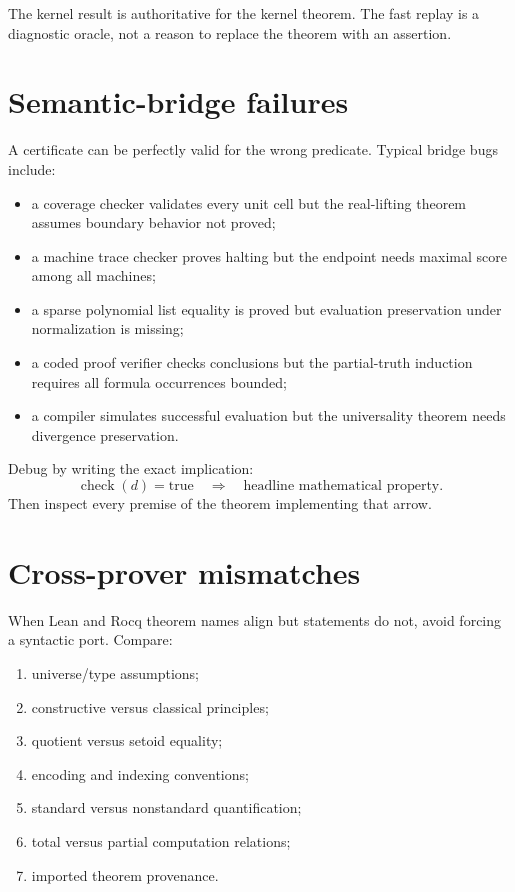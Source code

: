 \documentclass[
  10pt,
  a4paper,
  twoside,
  open=any,
  parskip=half,
  headings=big
]{scrreprt}
\begin{document}
The kernel result is authoritative for the kernel theorem.  The fast replay is
a diagnostic oracle, not a reason to replace the theorem with an assertion.

\section{Semantic-bridge failures}

A certificate can be perfectly valid for the wrong predicate.  Typical bridge
bugs include:

\begin{itemize}
  \item a coverage checker validates every unit cell but the real-lifting
        theorem assumes boundary behavior not proved;
  \item a machine trace checker proves halting but the endpoint needs maximal
        score among all machines;
  \item a sparse polynomial list equality is proved but evaluation preservation
        under normalization is missing;
  \item a coded proof verifier checks conclusions but the partial-truth
        induction requires all formula occurrences bounded;
  \item a compiler simulates successful evaluation but the universality
        theorem needs divergence preservation.
\end{itemize}

Debug by writing the exact implication:
\[
  \operatorname{check}(d)=\mathrm{true}
  \quad\Longrightarrow\quad
  \text{headline mathematical property}.
\]
Then inspect every premise of the theorem implementing that arrow.

\section{Cross-prover mismatches}

When Lean and Rocq theorem names align but statements do not, avoid forcing a
syntactic port.  Compare:

\begin{enumerate}
  \item universe/type assumptions;
  \item constructive versus classical principles;
  \item quotient versus setoid equality;
  \item encoding and indexing conventions;
  \item standard versus nonstandard quantification;
  \item total versus partial computation relations;
  \item imported theorem provenance.
\end{enumerate}
\end{document}
